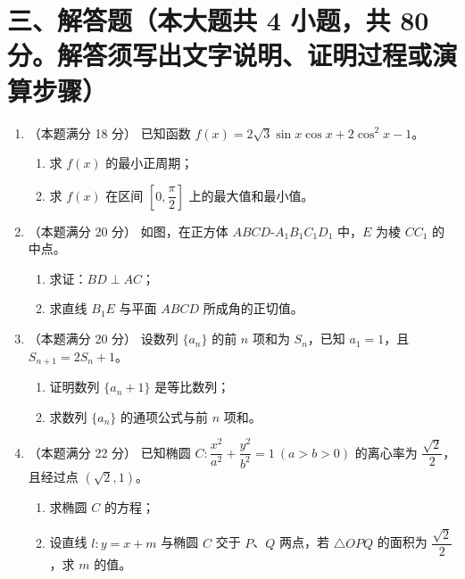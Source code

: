\documentclass[zihao=-4,a4paper]{ctexart}
\begin{document}
\section*{三、解答题（本大题共 4 小题，共 80 分。解答须写出文字说明、证明过程或演算步骤）}

\begin{enumerate}[label=\textbf{\arabic*.}, itemsep=10pt]
  \item （本题满分 18 分）
  已知函数 $f(x) = 2\sqrt{3}\sin x\cos x + 2\cos^2 x - 1$。
  \begin{enumerate}[label=(\arabic*), itemsep=4pt]
    \item 求 $f(x)$ 的最小正周期；
    \item 求 $f(x)$ 在区间 $\left[0, \dfrac{\pi}{2}\right]$ 上的最大值和最小值。
  \end{enumerate}

  \item （本题满分 20 分）
  如图，在正方体 $ABCD\text{-}A_1B_1C_1D_1$ 中，$E$ 为棱 $CC_1$ 的中点。
  \begin{enumerate}[label=(\arabic*), itemsep=4pt]
    \item 求证：$BD \perp AC$；
    \item 求直线 $B_1E$ 与平面 $ABCD$ 所成角的正切值。
  \end{enumerate}

  \item （本题满分 20 分）
  设数列 $\{a_n\}$ 的前 $n$ 项和为 $S_n$，已知 $a_1 = 1$，且 $S_{n+1} = 2S_n + 1$。
  \begin{enumerate}[label=(\arabic*), itemsep=4pt]
    \item 证明数列 $\{a_n + 1\}$ 是等比数列；
    \item 求数列 $\{a_n\}$ 的通项公式与前 $n$ 项和。
  \end{enumerate}

  \item （本题满分 22 分）
  已知椭圆 $C\colon \dfrac{x^2}{a^2} + \dfrac{y^2}{b^2} = 1\ (a > b > 0)$ 的离心率为 $\dfrac{\sqrt{2}}{2}$，
  且经过点 $\left(\sqrt{2}, 1\right)$。
  \begin{enumerate}[label=(\arabic*), itemsep=4pt]
    \item 求椭圆 $C$ 的方程；
    \item 设直线 $l\colon y = x + m$ 与椭圆 $C$ 交于 $P$、$Q$ 两点，若 $\triangle OPQ$ 的面积为
    $\dfrac{\sqrt{2}}{2}$，求 $m$ 的值。
  \end{enumerate}
\end{enumerate}
\end{document}
